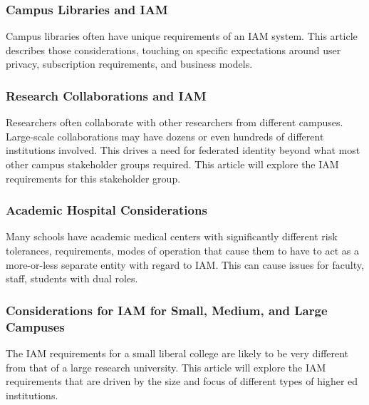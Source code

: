 \hypertarget{campus-libraries-and-iam}{%
\subsubsection{Campus Libraries and IAM}\label{campus-libraries-and-iam}}

Campus libraries often have unique requirements of an IAM system. This
article describes those considerations, touching on specific
expectations around user privacy, subscription requirements, and
business models.

\hypertarget{research-collaborations-and-iam}{%
\subsubsection{Research Collaborations and
IAM}\label{research-collaborations-and-iam}}

Researchers often collaborate with other researchers from different
campuses. Large-scale collaborations may have dozens or even hundreds of
different institutions involved. This drives a need for federated
identity beyond what most other campus stakeholder groups required. This
article will explore the IAM requirements for this stakeholder group.

\hypertarget{academic-hospital-considerations}{%
\subsubsection{Academic Hospital
Considerations}\label{academic-hospital-considerations}}

Many schools have academic medical centers with significantly different
risk tolerances, requirements, modes of operation that cause them to
have to act as a more-or-less separate entity with regard to IAM. This
can cause issues for faculty, staff, students with dual roles.

\hypertarget{considerations-for-iam-for-small-medium-and-large-campuses}{%
\subsubsection{Considerations for IAM for Small, Medium, and Large
Campuses}\label{considerations-for-iam-for-small-medium-and-large-campuses}}

The IAM requirements for a small liberal college are likely to be very
different from that of a large research university. This article will
explore the IAM requirements that are driven by the size and focus of
different types of higher ed institutions.

